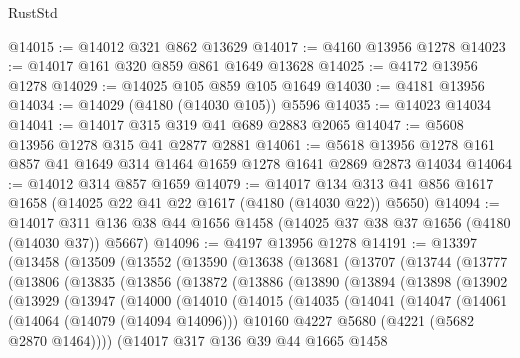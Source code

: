 \begin{lexlean}{RustStd}
\begin{coremodule}
@14015 := @14012 @321 @862 @13629
@14017 := @4160 @13956 @1278
@14023 := @14017 @161 @320 @859 @861 @1649 @13628
@14025 := @4172 @13956 @1278
@14029 := @14025 @105 @859 @105 @1649
@14030 := @4181 @13956
@14034 := @14029 (@4180 (@14030 @105)) @5596
@14035 := @14023 @14034
@14041 := @14017 @315 @319 @41 @689 @2883 @2065
@14047 := @5608 @13956 @1278 @315 @41 @2877 @2881
@14061 := @5618 @13956 @1278 @161 @857 @41 @1649 @314 @1464 @1659 @1278 @1641 @2869 @2873 @14034
@14064 := @14012 @314 @857 @1659
@14079 := @14017
    @134
    @313
    @41
    @856
    @1617
    @1658
    (@14025 @22 @41 @22 @1617 (@4180 (@14030 @22)) @5650)
@14094 := @14017 @311 @136 @38 @44 @1656 @1458 (@14025 @37 @38 @37 @1656 (@4180 (@14030 @37)) @5667)
@14096 := @4197 @13956 @1278
@14191 := @13397
    (@13458
      (@13509
        (@13552
          (@13590
            (@13638
              (@13681
                (@13707
                  (@13744
                    (@13777
                      (@13806
                        (@13835
                          (@13856
                            (@13872
                              (@13886
                                (@13890
                                  (@13894
                                    (@13898
                                      (@13902
                                        (@13929
                                          (@13947
                                            (@14000
                                              (@14010
                                                (@14015
                                                  (@14035
                                                    (@14041
                                                      (@14047
                                                        (@14061
                                                          (@14064 (@14079 (@14094 @14096)))
                                                          @10160
                                                          @4227
                                                          @5680
                                                          (@4221 (@5682 @2870 @1464))))
                                                      (@14017
                                                        @317
                                                        @136
                                                        @39
                                                        @44
                                                        @1665
                                                        @1458

\end{coremodule}
\end{lexlean}
